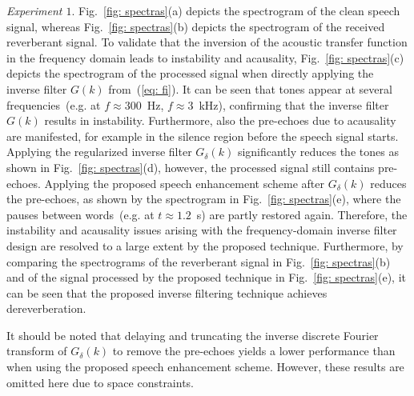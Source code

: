 \documentclass{article}
\begin{document}
{\it{Experiment $\mathit{1}$}}. \enspace Fig.~\ref{fig: spectras}(a) depicts the spectrogram of the clean speech signal, whereas Fig.~\ref{fig: spectras}(b) depicts the spectrogram of the received reverberant signal. 
To validate that the inversion of the acoustic transfer function in the frequency domain leads to instability and acausality, Fig.~\ref{fig: spectras}(c) depicts the spectrogram of the processed signal when directly applying the inverse filter $G(k)$ from~(\ref{eq: fi}). 
It can be seen that tones appear at several frequencies~(e.g. at $f \approx 300$~Hz, $f \approx 3$~kHz), confirming that the inverse filter $G(k)$ results in instability. 
Furthermore, also the pre-echoes due to acausality are manifested, for example in the silence region before the speech signal starts.
Applying the regularized inverse filter $G_{\delta}(k)$ significantly reduces the tones as shown in Fig.~\ref{fig: spectras}(d), however, the processed signal still contains pre-echoes. 
Applying the proposed speech enhancement scheme after $G_{\delta}(k)$ reduces the pre-echoes, as shown by the spectrogram in Fig.~\ref{fig: spectras}(e), where the pauses between words~(e.g. at $t \approx 1.2$~s) are partly restored again.
Therefore, the instability and acausality issues arising with the frequency-domain inverse filter design are resolved to a large extent by the proposed technique. 
Furthermore, by comparing the spectrograms of the reverberant signal in Fig.~\ref{fig: spectras}(b) and of the signal processed by the proposed technique in Fig.~\ref{fig: spectras}(e), it can be seen that the proposed inverse filtering technique achieves dereverberation.

It should be noted that delaying and truncating the inverse discrete Fourier transform of $G_{\delta}(k)$ to remove the pre-echoes yields a lower performance than when using the proposed speech enhancement scheme. 
However, these results are omitted here due to space constraints.
\end{document}
